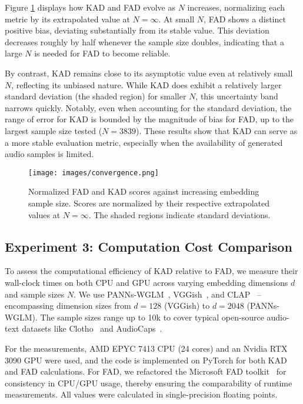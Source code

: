 Figure \ref{fig:sample_convergence} displays how KAD and FAD evolve as $N$ increases, normalizing each metric by its extrapolated value at $N=\infty$. At small $N$, FAD shows a distinct positive bias, deviating substantially from its stable value. This deviation decreases roughly by half whenever the sample size doubles, indicating that a large $N$ is needed for FAD to become reliable.

By contrast, KAD remains close to its asymptotic value even at relatively small $N$, reflecting its unbiased nature. While KAD does exhibit a relatively larger standard deviation (the shaded region) for smaller $N$, this uncertainty band narrows quickly. Notably, even when accounting for the standard deviation, the range of error for KAD is bounded by the magnitude of bias for FAD, up to the largest sample size tested ($N=3839$). These results show that KAD can serve as a more stable evaluation metric, especially when the availability of generated audio samples is limited.

\begin{figure}[t]
    \centering
    \texttt{[image: images/convergence.png]}
    \vspace{-0.3cm}
    \caption{Normalized FAD and KAD scores against increasing embedding sample size. Scores are normalized by their respective extrapolated values at $N=\infty$. The shaded regions indicate standard deviations.}
    \label{fig:sample_convergence}
\end{figure}


\subsection{Experiment 3: Computation Cost Comparison}
\label{ssec:exp_compute}
To assess the computational efficiency of KAD relative to FAD, we measure their wall-clock times on both CPU and GPU across varying embedding dimensions $d$ and sample sizes $N$. We use PANNs-WGLM~\cite{panns}, VGGish~\cite{vggish}, and CLAP~\cite{clap_ms} -- encompassing dimension sizes from $d=128$ (VGGish) to $d=2048$ (PANNs-WGLM). The sample sizes range up to 10k to cover typical open-source audio-text datasets like Clotho~\cite{drossos2020clotho} and AudioCaps~\cite{kim2019audiocaps}.

For the measurements, AMD EPYC 7413 CPU (24 cores) and an Nvidia RTX 3090 GPU were used, and the code is implemented on PyTorch for both KAD and FAD calculations. For FAD, we refactored the Microsoft FAD toolkit~\cite{gui2024adapting} for consistency in CPU/GPU usage, thereby ensuring the comparability of runtime measurements. All values were calculated in single-precision floating points.

